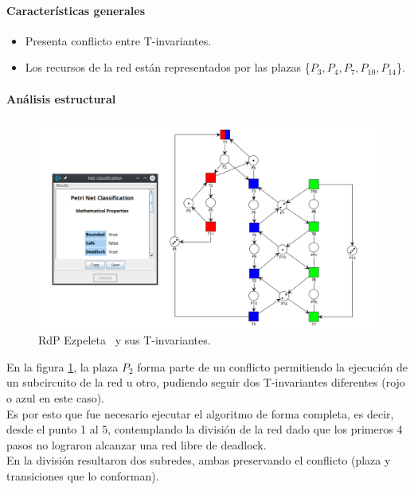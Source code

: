 \paragraph{Características generales}
\begin{itemize}
    \item Presenta conflicto entre T-invariantes.
    \item Los recursos de la red están representados por las plazas \{$P_3,P_4,P_7,P_{10},P_{14}$\}.
\end{itemize}

\paragraph{Análisis estructural}
\hfill
\begin{figure}[H]
	\centering
	\includegraphics[scale=0.5]{Figures/algoritmo3/ezpeleta1.png}
	\caption[RdP Ezpeleta y sus T-invariantes.]{RdP Ezpeleta \footnotemark \ y sus T-invariantes.}
	\label{fig:ezpeletatinvariante}
 \end{figure} 

En la figura \ref{fig:ezpeletatinvariante}, la plaza $P_2$ forma parte de un conflicto permitiendo la ejecución de un subcircuito de la red u otro, pudiendo seguir dos T-invariantes diferentes (rojo o azul en este caso). \\
Es por esto que fue necesario ejecutar el algoritmo de forma completa, es decir, desde el punto 1 al 5, contemplando la división de la red dado que los primeros 4 pasos no lograron alcanzar una red libre de deadlock.\\
En la división resultaron dos subredes, ambas preservando el conflicto (plaza y transiciones que lo conforman).

